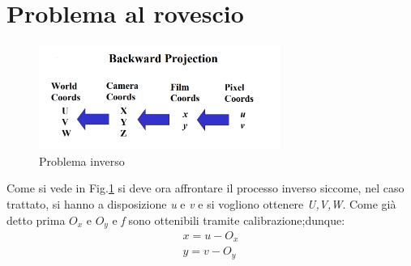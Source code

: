\section{Problema al rovescio}
\begin{figure}[H]
	\centering
	\includegraphics[width=0.7\textwidth]{Immagini/backward.png}
	\caption{Problema inverso}
	\label{fig:backward}
\end{figure}

Come si vede in Fig.\ref{fig:backward} si deve ora affrontare il processo inverso siccome, nel caso trattato, si hanno a disposizione \textit{u} e \textit{v} e si vogliono ottenere \textit{U,V,W}.
Come già detto prima $ O_{x}$ e $ O_{y} $ e \textit{f} sono ottenibili tramite calibrazione;dunque:
\begin{equation}
\begin{split}
x = u -O_{x}\\
y = v -O_{y}
\end{split}
\end{equation}

